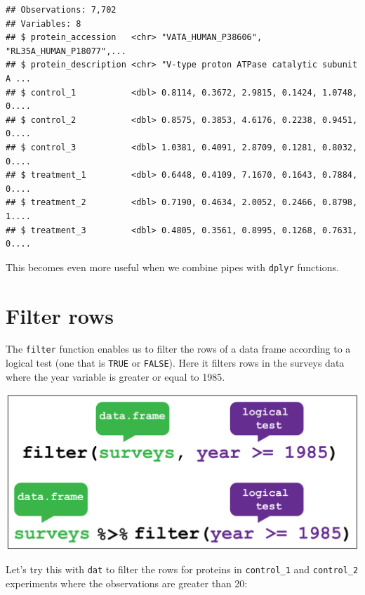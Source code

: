\documentclass[12pt,]{book}
\newenvironment{Shaded}{\begin{snugshade}}{\end{snugshade}}
\newcommand{\DecValTok}[1]{\textcolor[rgb]{0.00,0.00,0.81}{#1}}
\newcommand{\KeywordTok}[1]{\textcolor[rgb]{0.13,0.29,0.53}{\textbf{#1}}}
\newcommand{\NormalTok}[1]{#1}
\newcommand{\OperatorTok}[1]{\textcolor[rgb]{0.81,0.36,0.00}{\textbf{#1}}}
\newcommand{\StringTok}[1]{\textcolor[rgb]{0.31,0.60,0.02}{#1}}
\begin{document}
\begin{verbatim}
## Observations: 7,702
## Variables: 8
## $ protein_accession   <chr> "VATA_HUMAN_P38606", "RL35A_HUMAN_P18077",...
## $ protein_description <chr> "V-type proton ATPase catalytic subunit A ...
## $ control_1           <dbl> 0.8114, 0.3672, 2.9815, 0.1424, 1.0748, 0....
## $ control_2           <dbl> 0.8575, 0.3853, 4.6176, 0.2238, 0.9451, 0....
## $ control_3           <dbl> 1.0381, 0.4091, 2.8709, 0.1281, 0.8032, 0....
## $ treatment_1         <dbl> 0.6448, 0.4109, 7.1670, 0.1643, 0.7884, 0....
## $ treatment_2         <dbl> 0.7190, 0.4634, 2.0052, 0.2466, 0.8798, 1....
## $ treatment_3         <dbl> 0.4805, 0.3561, 0.8995, 0.1268, 0.7631, 0....
\end{verbatim}

This becomes even more useful when we combine pipes with \texttt{dplyr} functions.

\hypertarget{filter}{%
\section{Filter rows}\label{filter}}

The \texttt{filter} function enables us to filter the rows of a data frame according to
a logical test (one that is \texttt{TRUE} or \texttt{FALSE}). Here it filters rows in
the surveys data where the year variable is greater or equal to 1985.

\begin{center}\includegraphics[width=0.8\linewidth]{img/dplyr_filter} \end{center}

Let's try this with \texttt{dat} to filter the rows for proteins in \texttt{control\_1} and
\texttt{control\_2} experiments where the observations are greater than 20:

\begin{Shaded}
\end{Shaded}
\end{document}

